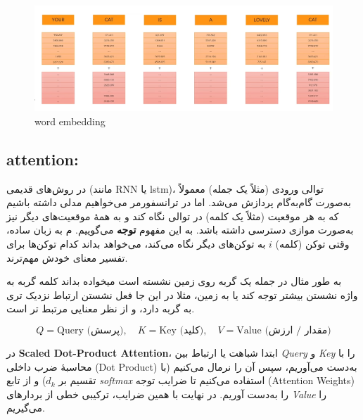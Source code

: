 \begin{figure}[h]
	\centering
	\begin{minipage}[b]{0.7\textwidth}
		\centering
		\includegraphics[width=\textwidth]{transformer_images/positional_embedding.png}
		\caption{word embedding}
		\label{fig:word embedding + positional embedding}
	\end{minipage}
	\hfill
	
\end{figure}






\subsection{attention:}



در روش‌های قدیمی (مانند RNN یا lstm)، توالی ورودی (مثلاً یک جمله) معمولاً به‌صورت گام‌به‌گام پردازش می‌شد. اما در ترانسفورمر می‌خواهیم مدلی داشته باشیم که به هر موقعیت (مثلاً یک کلمه) در توالی نگاه کند و به همهٔ موقعیت‌های دیگر نیز به‌صورت موازی دسترسی داشته باشد. به این مفهوم \textbf{توجه} می‌گوییم.
م
به زبان ساده، وقتی توکن (کلمه) $i$ به توکن‌های دیگر نگاه می‌کند، می‌خواهد بداند کدام توکن‌ها برای تفسیر معنای خودش مهم‌ترند.

به طور مثال در جمله  یک گربه روی زمین نشسته است میخواده بداند کلمه گربه به واژه نشستن بیشتر توجه کند یا به زمین، مثلا در این جا فعل نشستن ارتباط نزدیک تری به گربه دارد، و از نظر معنایی مرتبط تر است.




\[
Q = \text{Query (پرسش)}, \quad K = \text{Key (کلید)}, \quad V = \text{Value (مقدار / ارزش)}
\]

در \textbf{Scaled Dot-Product Attention}، ابتدا شباهت یا ارتباط بین \textit{Query} و \textit{Key} را با محاسبهٔ ضرب داخلی (Dot Product) به‌دست می‌آوریم، سپس آن را نرمال می‌کنیم (با تقسیم بر \( d_k \)) و از تابع \textit{softmax} استفاده می‌کنیم تا ضرایب توجه (Attention Weights) را به‌دست آوریم. در نهایت با همین ضرایب، ترکیبی خطی از بردارهای \textit{Value} را می‌گیریم.

